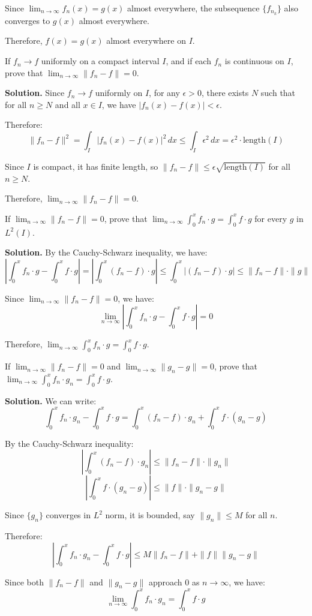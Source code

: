 Since $\lim_{n \to \infty} f_n(x) = g(x)$ almost everywhere, the subsequence $\{f_{n_k}\}$ also converges to $g(x)$ almost everywhere.

Therefore, $f(x) = g(x)$ almost everywhere on $I$.

\begin{problembox}
If $f_n \to f$ uniformly on a compact interval $I$, and if each $f_n$ is continuous on $I$, prove that $\lim_{n \to \infty} \| f_n - f \| = 0$.
\end{problembox}

\noindent\textbf{Solution.}
Since $f_n \to f$ uniformly on $I$, for any $\epsilon > 0$, there exists $N$ such that for all $n \geq N$ and all $x \in I$, we have $|f_n(x) - f(x)| < \epsilon$.

Therefore:
\[\| f_n - f \|^2 = \int_I |f_n(x) - f(x)|^2 \, dx \leq \int_I \epsilon^2 \, dx = \epsilon^2 \cdot \text{length}(I)\]

Since $I$ is compact, it has finite length, so $\| f_n - f \| \leq \epsilon \sqrt{\text{length}(I)}$ for all $n \geq N$.

Therefore, $\lim_{n \to \infty} \| f_n - f \| = 0$.

\begin{problembox}
If $\lim_{n \to \infty} \| f_n - f \| = 0$, prove that $\lim_{n \to \infty} \int_0^x f_n \cdot g = \int_0^x f \cdot g$ for every $g$ in $L^2(I)$.
\end{problembox}

\noindent\textbf{Solution.}
By the Cauchy-Schwarz inequality, we have:
\[\left|\int_0^x f_n \cdot g - \int_0^x f \cdot g\right| = \left|\int_0^x (f_n - f) \cdot g\right| \leq \int_0^x |(f_n - f) \cdot g| \leq \| f_n - f \| \cdot \| g \|\]

Since $\lim_{n \to \infty} \| f_n - f \| = 0$, we have:
\[\lim_{n \to \infty} \left|\int_0^x f_n \cdot g - \int_0^x f \cdot g\right| = 0\]

Therefore, $\lim_{n \to \infty} \int_0^x f_n \cdot g = \int_0^x f \cdot g$.

\begin{problembox}
If $\lim_{n \to \infty} \| f_n - f \| = 0$ and $\lim_{n \to \infty} \| g_n - g \| = 0$, prove that $\lim_{n \to \infty} \int_0^x f_n \cdot g_n = \int_0^x f \cdot g$.
\end{problembox}

\noindent\textbf{Solution.}
We can write:
\[\int_0^x f_n \cdot g_n - \int_0^x f \cdot g = \int_0^x (f_n - f) \cdot g_n + \int_0^x f \cdot (g_n - g)\]

By the Cauchy-Schwarz inequality:
\[\left|\int_0^x (f_n - f) \cdot g_n\right| \leq \| f_n - f \| \cdot \| g_n \|\]
\[\left|\int_0^x f \cdot (g_n - g)\right| \leq \| f \| \cdot \| g_n - g \|\]

Since $\{g_n\}$ converges in $L^2$ norm, it is bounded, say $\| g_n \| \leq M$ for all $n$.

Therefore:
\[\left|\int_0^x f_n \cdot g_n - \int_0^x f \cdot g\right| \leq M \| f_n - f \| + \| f \| \| g_n - g \|\]

Since both $\| f_n - f \|$ and $\| g_n - g \|$ approach 0 as $n \to \infty$, we have:
\[\lim_{n \to \infty} \int_0^x f_n \cdot g_n = \int_0^x f \cdot g\]